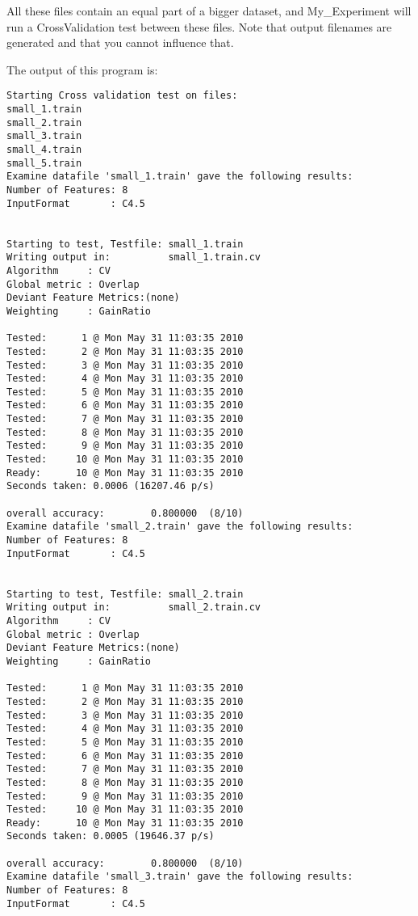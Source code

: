 \documentclass{report}
\begin{document}
All these files contain an equal part of a bigger dataset, and
My\_Experiment will run a CrossValidation test between these files.
Note that output filenames are generated and that you cannot influence
that.

The output of this program is:

\begin{footnotesize}
\begin{verbatim}
Starting Cross validation test on files:
small_1.train
small_2.train
small_3.train
small_4.train
small_5.train
Examine datafile 'small_1.train' gave the following results:
Number of Features: 8
InputFormat       : C4.5


Starting to test, Testfile: small_1.train
Writing output in:          small_1.train.cv
Algorithm     : CV
Global metric : Overlap
Deviant Feature Metrics:(none)
Weighting     : GainRatio

Tested:      1 @ Mon May 31 11:03:35 2010
Tested:      2 @ Mon May 31 11:03:35 2010
Tested:      3 @ Mon May 31 11:03:35 2010
Tested:      4 @ Mon May 31 11:03:35 2010
Tested:      5 @ Mon May 31 11:03:35 2010
Tested:      6 @ Mon May 31 11:03:35 2010
Tested:      7 @ Mon May 31 11:03:35 2010
Tested:      8 @ Mon May 31 11:03:35 2010
Tested:      9 @ Mon May 31 11:03:35 2010
Tested:     10 @ Mon May 31 11:03:35 2010
Ready:      10 @ Mon May 31 11:03:35 2010
Seconds taken: 0.0006 (16207.46 p/s)

overall accuracy:        0.800000  (8/10)
Examine datafile 'small_2.train' gave the following results:
Number of Features: 8
InputFormat       : C4.5


Starting to test, Testfile: small_2.train
Writing output in:          small_2.train.cv
Algorithm     : CV
Global metric : Overlap
Deviant Feature Metrics:(none)
Weighting     : GainRatio

Tested:      1 @ Mon May 31 11:03:35 2010
Tested:      2 @ Mon May 31 11:03:35 2010
Tested:      3 @ Mon May 31 11:03:35 2010
Tested:      4 @ Mon May 31 11:03:35 2010
Tested:      5 @ Mon May 31 11:03:35 2010
Tested:      6 @ Mon May 31 11:03:35 2010
Tested:      7 @ Mon May 31 11:03:35 2010
Tested:      8 @ Mon May 31 11:03:35 2010
Tested:      9 @ Mon May 31 11:03:35 2010
Tested:     10 @ Mon May 31 11:03:35 2010
Ready:      10 @ Mon May 31 11:03:35 2010
Seconds taken: 0.0005 (19646.37 p/s)

overall accuracy:        0.800000  (8/10)
Examine datafile 'small_3.train' gave the following results:
Number of Features: 8
InputFormat       : C4.5



\end{verbatim}
\end{footnotesize}
\end{document}
